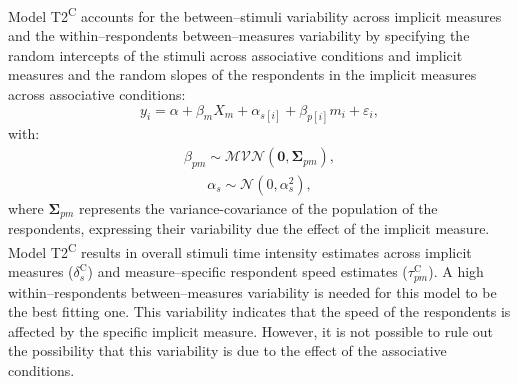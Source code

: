 \documentclass[12pt]{book}
\begin{document}
Model T2\textsuperscript{C} accounts for the between--stimuli variability across implicit measures and the within--respondents between--measures variability by specifying the random intercepts of the stimuli across associative conditions and implicit measures and the random slopes of the respondents in the implicit measures across associative conditions: 
%
\begin{equation}\label{eq:type1t}
	y_{i} = \alpha + \beta_mX_m + \alpha_{s[i]} +  \beta_{p[i]}m_{i} + \varepsilon_{i},
\end{equation}
with:
\begin{align}
	\beta_{pm} \sim \mathcal{MVN}(\bm{0}, \bm{\Sigma}_{pm}),
\end{align}
\begin{align}
	\alpha_s \sim \mathcal{N} (0, \alpha_s^2),
\end{align}
where $\bm{\Sigma}_{pm}$ represents the variance-covariance of the population of the respondents, expressing their variability due the effect of the implicit measure. 
Model T2\textsuperscript{C} results in overall stimuli time intensity estimates across implicit measures ($\delta_s^\text{C}$) and measure--specific respondent speed estimates ($\tau_{pm}^\text{C}$). 
A high within--respondents between--measures variability is needed for this model to be the best fitting one. This variability indicates that the speed of the respondents is affected by the specific implicit measure. However, it is not possible to rule out the possibility that this variability is due to the effect of the associative conditions.
\end{document}
